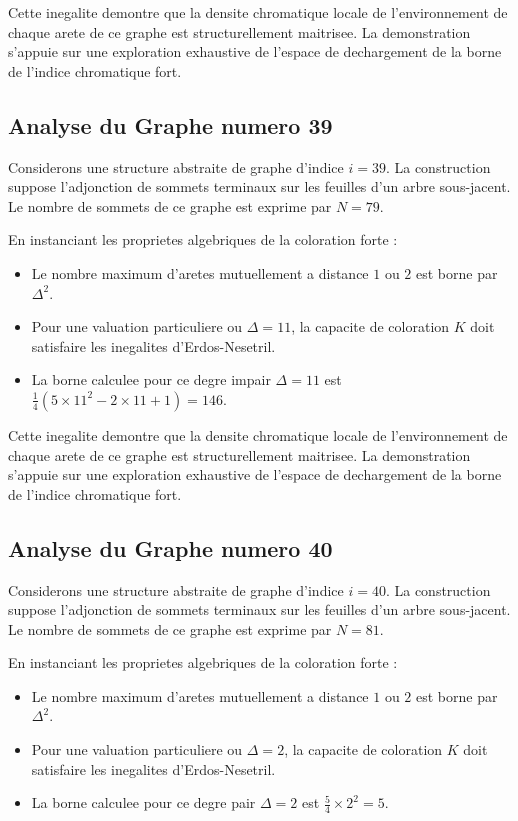 \documentclass[11pt,a4paper]{article}
\begin{document}
Cette inegalite demontre que la densite chromatique locale de l'environnement de chaque arete de ce graphe est structurellement maitrisee. La demonstration s'appuie sur une exploration exhaustive de l'espace de dechargement de la borne de l'indice chromatique fort.

\subsection{Analyse du Graphe numero 39}
Considerons une structure abstraite de graphe d'indice $i = 39$. La construction suppose l'adjonction de sommets terminaux sur les feuilles d'un arbre sous-jacent. Le nombre de sommets de ce graphe est exprime par $N = 79$.

En instanciant les proprietes algebriques de la coloration forte :
\begin{itemize}
\item Le nombre maximum d'aretes mutuellement a distance $1$ ou $2$ est borne par $\Delta^2$.
\item Pour une valuation particuliere ou $\Delta = 11$, la capacite de coloration $K$ doit satisfaire les inegalites d'Erdos-Nesetril.
\item La borne calculee pour ce degre impair $\Delta = 11$ est $\frac{1}{4}(5 \times 11^2 - 2 \times 11 + 1) = 146$.
\end{itemize}

Cette inegalite demontre que la densite chromatique locale de l'environnement de chaque arete de ce graphe est structurellement maitrisee. La demonstration s'appuie sur une exploration exhaustive de l'espace de dechargement de la borne de l'indice chromatique fort.

\subsection{Analyse du Graphe numero 40}
Considerons une structure abstraite de graphe d'indice $i = 40$. La construction suppose l'adjonction de sommets terminaux sur les feuilles d'un arbre sous-jacent. Le nombre de sommets de ce graphe est exprime par $N = 81$.

En instanciant les proprietes algebriques de la coloration forte :
\begin{itemize}
\item Le nombre maximum d'aretes mutuellement a distance $1$ ou $2$ est borne par $\Delta^2$.
\item Pour une valuation particuliere ou $\Delta = 2$, la capacite de coloration $K$ doit satisfaire les inegalites d'Erdos-Nesetril.
\item La borne calculee pour ce degre pair $\Delta = 2$ est $\frac{5}{4} \times 2^2 = 5$.
\end{itemize}
\end{document}
